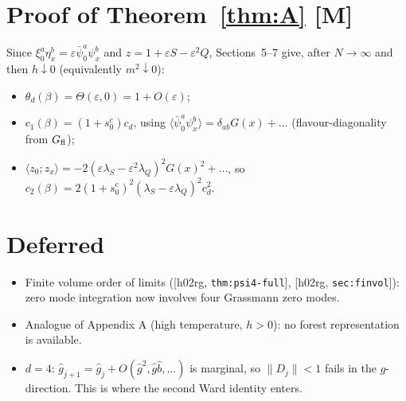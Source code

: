 \documentclass[11pt]{article}
\theoremstyle{remark}
\theoremstyle{definition}
\newcommand{\avg}[1]{\langle #1\rangle}
\newcommand{\st}[1]{\textsf{[#1]}}
\newcommand{\hr}[1]{\textup{[h02rg, \texttt{#1}]}}
\begin{document}
\section{Proof of Theorem~\ref{thm:A} \st{M}}
Since $\xi^a_0\eta^b_x=\varepsilon\bar\psi^a_0\psi^b_x$ and $z=1+\varepsilon S-\varepsilon^2Q$, Sections~5--7 give, after
$N\to\infty$ and then $h\downarrow0$ (equivalently $m^2\downarrow0$):
\begin{itemize}
\item $\theta_d(\beta)=\Theta(\varepsilon,0)=1+O(\varepsilon)$;
\item $c_1(\beta)=(1+s_0^c)c_d$, using $\avg{\bar\psi^a_0\psi^b_x}=\delta_{ab}G(x)+\dots$ (flavour-diagonality from $G_{\rm fl}$);
\item $\avg{z_0;z_x}=-2(\varepsilon\lambda_S-\varepsilon^2\lambda_Q)^2G(x)^2+\dots$, so $c_2(\beta)=2(1+s_0^c)^2(\lambda_S-\varepsilon\lambda_Q)^2c_d^2$.
\end{itemize}

\section{Deferred}
\begin{itemize}
\item Finite volume order of limits (\hr{thm:psi4-full}, \hr{sec:finvol}): zero mode integration now involves four Grassmann zero modes.
\item Analogue of Appendix A (high temperature, $h>0$): no forest representation is available.
\item $d=4$: $\hat g_{j+1}=\hat g_j+O(\hat g^2,\hat g\hat b,\dots)$ is marginal, so $\|D_j\|<1$ fails in the $g$-direction.
  This is where the second Ward identity enters.
\end{itemize}

\end{document}
